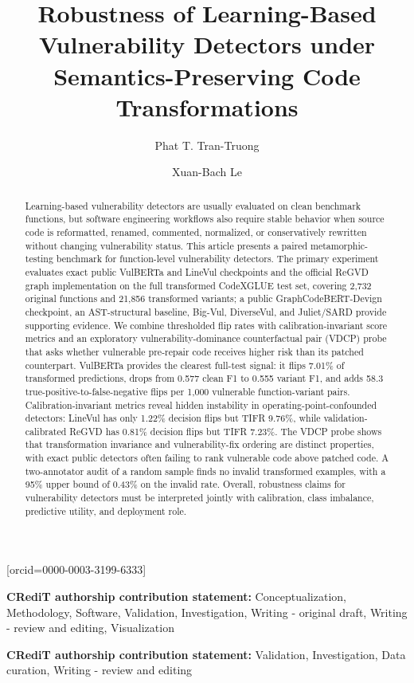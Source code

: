 \documentclass[a4paper,fleqn]{cas-dc}
\providecommand{\credit}[1]{%
  \par\smallskip\noindent\textbf{CRediT authorship contribution statement:} #1\par\smallskip
}
\begin{document}
\title[mode=title]{Robustness of Learning-Based Vulnerability Detectors under Semantics-Preserving Code Transformations}

\author[1,2]{Phat T. Tran-Truong}[orcid=0000-0003-3199-6333]
\credit{Conceptualization, Methodology, Software, Validation, Investigation, Writing - original draft, Writing - review and editing, Visualization}
\author[1,2]{Xuan-Bach Le}
\credit{Validation, Investigation, Data curation, Writing - review and editing}

\address[1]{Faculty of Computer Science and Engineering, Ho Chi Minh City University of Technology (HCMUT), 268 Ly Thuong Kiet Street, Dien Hong Ward, Ho Chi Minh City, Vietnam}
\address[2]{Vietnam National University Ho Chi Minh City, Linh Xuan Ward, Ho Chi Minh City, Vietnam}

\begin{abstract}
Learning-based vulnerability detectors are usually evaluated on clean benchmark
functions, but software engineering workflows also require stable behavior when
source code is reformatted, renamed, commented, normalized, or conservatively
rewritten without changing vulnerability status. This article presents a paired
metamorphic-testing benchmark for function-level vulnerability detectors. The
primary experiment evaluates exact public VulBERTa and LineVul checkpoints and
the official ReGVD graph implementation on the full transformed CodeXGLUE test
set, covering 2,732 original functions and 21,856 transformed variants; a public
GraphCodeBERT-Devign checkpoint, an AST-structural baseline, Big-Vul,
DiverseVul, and Juliet/SARD provide supporting evidence. We combine
thresholded flip rates with calibration-invariant score metrics and an
exploratory vulnerability-dominance counterfactual pair (VDCP) probe that asks
whether vulnerable pre-repair code receives higher risk than its patched
counterpart. VulBERTa provides the clearest full-test signal: it flips 7.01\%
of transformed predictions, drops from 0.577 clean F1 to 0.555 variant F1, and
adds 58.3 true-positive-to-false-negative flips per 1,000 vulnerable
function-variant pairs. Calibration-invariant metrics reveal hidden instability
in operating-point-confounded detectors: LineVul has only 1.22\% decision flips
but TIFR 9.76\%, while validation-calibrated ReGVD has 0.81\% decision flips
but TIFR 7.23\%. The VDCP probe shows that transformation invariance and
vulnerability-fix ordering are distinct properties, with exact public detectors
often failing to rank vulnerable code above patched code. A two-annotator audit
of a random sample finds no invalid transformed examples, with a 95\% upper
bound of 0.43\% on the invalid rate. Overall, robustness claims for
vulnerability detectors must be interpreted jointly with calibration, class
imbalance, predictive utility, and deployment role.
\end{abstract}
\end{document}
